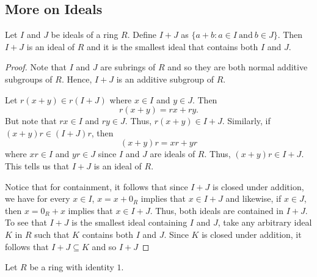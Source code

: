 \subsection{More on Ideals}

\begin{prop}
Let \( I  \) and \( J  \) be ideals of a ring \( R  \). 
Define \( I + J  \) as \( \{ a + b : a \in I \ \text{and} \ b \in J  \}  \). Then \( I + J  \) is an ideal of \( R  \) and it is the smallest ideal that contains both \( I \) and \( J  \).
\end{prop}
\begin{proof}
Note that \( I  \) and \( J  \) are subrings of \( R  \) and so they are both normal additive subgroups of \( R  \). Hence, \( I + J  \) is an additive subgroup of \( R  \).

Let \( r (x + y) \in r (I + J ) \) where \( x \in I  \) and \( y \in J  \). Then 
\[  r(x + y) = rx + ry.  \]
But note that \( rx \in I  \) and \( ry \in J  \). Thus, \( r(x+y) \in I + J  \). Similarly, if \( (x+y)r \in (I + J)r  \), then 
\[  (x+y)r = xr + yr \]
where \( xr \in I  \) and \( yr \in J  \) since \( I  \) and \( J  \) are ideals of \( R  \). Thus, \( (x+y) r \in I + J  \). This tells us that \( I + J  \) is an ideal of \( R  \).

Notice that for containment, it follows that since \( I + J  \) is closed under addition, we have for every \( x \in I  \), \( x = x + {0}_{R} \) implies that \( x \in I +  J \) and likewise, if \( x \in J  \), then \( x = {0}_{R} + x  \) implies that \( x \in I + J  \). Thus, both ideals are contained in \( I + J  \). To see that \( I + J  \) is the smallest ideal containing \( I  \) and \( J  \), take any arbitrary ideal \( K  \) in \( R  \) such that \( K  \) contains both \( I  \) and \( J  \). Since \( K  \) is closed under addition, it follows that \( I + J  \subseteq K   \) and so \( I + J  \)
\end{proof}

Let \( R  \) be a ring with identity \( 1  \).


